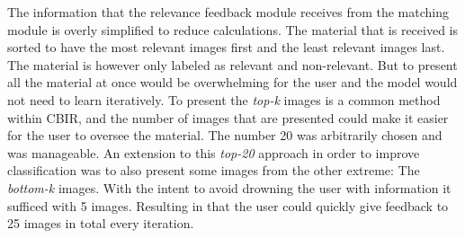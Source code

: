 The information that the relevance feedback module receives from the matching module is overly simplified to reduce calculations. The material that is received is sorted to have the most relevant images first and the least relevant images last. The material is however only labeled as relevant and non-relevant. But to present all the material at once would be overwhelming for the user and the model would not need to learn iteratively. 
To present the \emph{top-k} images is a common method within CBIR, and the number of images that are presented could make it easier for the user to oversee the material. The number 20 was arbitrarily chosen and was  manageable. An extension to this \emph{top-20} approach in order to improve classification was to also present some images from the other extreme: The \emph{bottom-k} images. With the intent to avoid drowning the user with information it sufficed with 5 images. Resulting in that the user could quickly give feedback to 25 images in total every iteration. 
